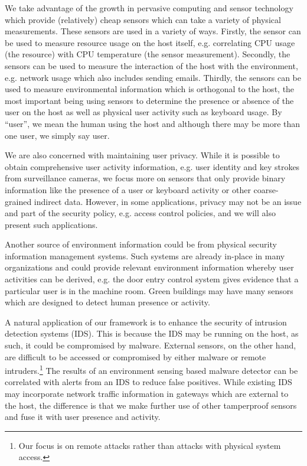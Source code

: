 We take advantage of the growth in pervasive computing and sensor technology
which provide (relatively) cheap sensors which can take a variety of physical
measurements.
These sensors are used in a variety of ways.
Firstly, the sensor can be used to measure resource usage on the host itself,
e.g. correlating CPU usage (the resource)
with CPU temperature (the sensor measurement).
Secondly, the sensors can be used to measure the interaction of the host
with the environment, e.g. network usage which also includes sending emails.
Thirdly, the sensors can be used to measure environmental information
which is orthogonal to the host, the most important being
using sensors to determine the presence or absence of
the user on the host as well as physical user activity such as keyboard usage.
By ``user'', we mean the human using the host and although
there may be more than one user, we simply say user.

We are also concerned with maintaining user privacy.
While it is possible to obtain comprehensive user activity information,
e.g. user identity and key strokes from
surveillance cameras, 
we focus more on sensors that only provide
binary information like the presence of a user or keyboard activity
or other coarse-grained indirect data.
However, in some applications, privacy may not be an issue and part of
the security policy, e.g. access control policies, and we will also
present such applications.

Another source of environment information could be from physical
security information management systems.
Such systems are already in-place in many organizations and could provide
relevant environment information whereby user activities can be
derived, e.g. the door entry control system gives
evidence that a particular user is in the machine room.
Green buildings may have many sensors which are designed to detect human
presence or activity.

A natural application of our framework is to enhance the security of
intrusion detection systems (IDS).
This is because the IDS may be running on the host, 
as such, it could be compromised by malware.
External sensors, on the other hand, are
difficult to be accessed or compromised by either malware or remote intruders.\footnote{
Our focus is on remote attacks rather than attacks with physical system access.
} 
The results of an environment sensing based malware detector 
can be correlated with alerts from an IDS to reduce false positives.
While existing IDS may incorporate network traffic information in
gateways which are external to the host, the difference is that we
make further use of other tamperproof sensors and fuse it with user
presence and activity. 

